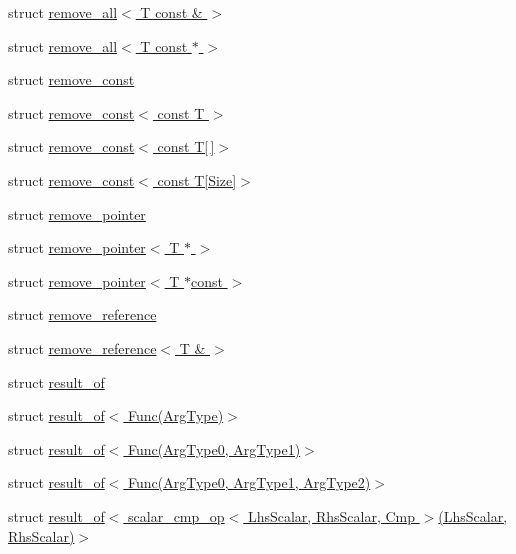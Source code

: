 \begin{DoxyCompactItemize}
\item 
struct \hyperlink{struct_eigen_1_1internal_1_1remove__all_3_01_t_01const_01_6_01_4}{remove\+\_\+all$<$ T const \& $>$}
\item 
struct \hyperlink{struct_eigen_1_1internal_1_1remove__all_3_01_t_01const_01_5_01_4}{remove\+\_\+all$<$ T const $\ast$ $>$}
\item 
struct \hyperlink{struct_eigen_1_1internal_1_1remove__const}{remove\+\_\+const}
\item 
struct \hyperlink{struct_eigen_1_1internal_1_1remove__const_3_01const_01_t_01_4}{remove\+\_\+const$<$ const T $>$}
\item 
struct \hyperlink{struct_eigen_1_1internal_1_1remove__const_3_01const_01_t[]_4}{remove\+\_\+const$<$ const T\mbox{[}$\,$\mbox{]}$>$}
\item 
struct \hyperlink{struct_eigen_1_1internal_1_1remove__const_3_01const_01_t[_size]_4}{remove\+\_\+const$<$ const T\mbox{[}\+Size\mbox{]}$>$}
\item 
struct \hyperlink{struct_eigen_1_1internal_1_1remove__pointer}{remove\+\_\+pointer}
\item 
struct \hyperlink{struct_eigen_1_1internal_1_1remove__pointer_3_01_t_01_5_01_4}{remove\+\_\+pointer$<$ T $\ast$ $>$}
\item 
struct \hyperlink{struct_eigen_1_1internal_1_1remove__pointer_3_01_t_01_5const_01_4}{remove\+\_\+pointer$<$ T $\ast$const $>$}
\item 
struct \hyperlink{struct_eigen_1_1internal_1_1remove__reference}{remove\+\_\+reference}
\item 
struct \hyperlink{struct_eigen_1_1internal_1_1remove__reference_3_01_t_01_6_01_4}{remove\+\_\+reference$<$ T \& $>$}
\item 
struct \hyperlink{struct_eigen_1_1internal_1_1result__of}{result\+\_\+of}
\item 
struct \hyperlink{struct_eigen_1_1internal_1_1result__of_3_01_func_07_arg_type_08_4}{result\+\_\+of$<$ Func(\+Arg\+Type)$>$}
\item 
struct \hyperlink{struct_eigen_1_1internal_1_1result__of_3_01_func_07_arg_type0_00_01_arg_type1_08_4}{result\+\_\+of$<$ Func(\+Arg\+Type0, Arg\+Type1)$>$}
\item 
struct \hyperlink{struct_eigen_1_1internal_1_1result__of_3_01_func_07_arg_type0_00_01_arg_type1_00_01_arg_type2_08_4}{result\+\_\+of$<$ Func(\+Arg\+Type0, Arg\+Type1, Arg\+Type2)$>$}
\item 
struct \hyperlink{struct_eigen_1_1internal_1_1result__of_3_01scalar__cmp__op_3_01_lhs_scalar_00_01_rhs_scalar_00_09c9877449c1099527f34eb0a0f299607}{result\+\_\+of$<$ scalar\+\_\+cmp\+\_\+op$<$ Lhs\+Scalar, Rhs\+Scalar, Cmp $>$(\+Lhs\+Scalar, Rhs\+Scalar)$>$}

\end{DoxyCompactItemize}
